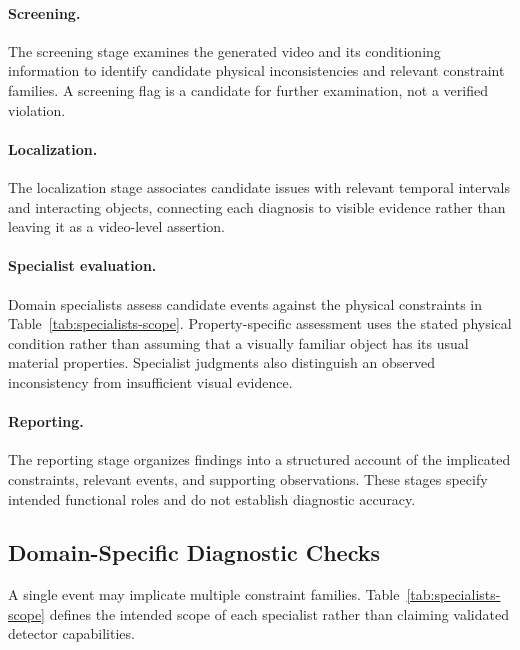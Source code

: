 \paragraph{Screening.}
The screening stage examines the generated video and its conditioning information to identify candidate physical inconsistencies and relevant constraint families. A screening flag is a candidate for further examination, not a verified violation.

\paragraph{Localization.}
The localization stage associates candidate issues with relevant temporal intervals and interacting objects, connecting each diagnosis to visible evidence rather than leaving it as a video-level assertion.

\paragraph{Specialist evaluation.}
Domain specialists assess candidate events against the physical constraints in Table~\ref{tab:specialists-scope}. Property-specific assessment uses the stated physical condition rather than assuming that a visually familiar object has its usual material properties. Specialist judgments also distinguish an observed inconsistency from insufficient visual evidence.

\paragraph{Reporting.}
The reporting stage organizes findings into a structured account of the implicated constraints, relevant events, and supporting observations. These stages specify intended functional roles and do not establish diagnostic accuracy.

\subsection{Domain-Specific Diagnostic Checks}
A single event may implicate multiple constraint families. Table~\ref{tab:specialists-scope} defines the intended scope of each specialist rather than claiming validated detector capabilities.

